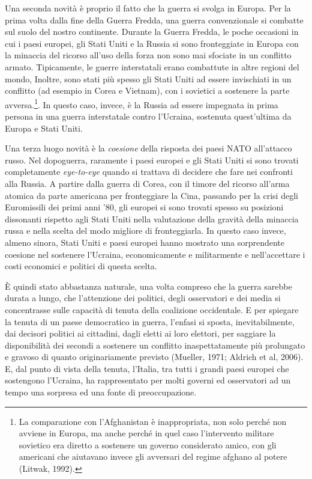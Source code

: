 \documentclass[
]{book}
\begin{document}
Una seconda novità è proprio il fatto che la guerra si svolga in Europa. Per la prima volta dalla fine della Guerra Fredda, una guerra convenzionale si combatte sul suolo del nostro continente. Durante la Guerra Fredda, le poche occasioni in cui i paesi europei, gli Stati Uniti e la Russia si sono fronteggiate in Europa con la minaccia del ricorso all'uso della forza non sono mai sfociate in un conflitto armato. Tipicamente, le guerre interstatali erano combattute in altre regioni del mondo, Inoltre, sono stati più spesso gli Stati Uniti ad essere invischiati in un conflitto (ad esempio in Corea e Vietnam), con i sovietici a sostenere la parte avversa.\footnote{La comparazione con l'Afghanistan è inappropriata, non solo perché non avviene in Europa, ma anche perché in quel caso l'intervento militare sovietico era diretto a sostenere un governo considerato amico, con gli americani che aiutavano invece gli avversari del regime afghano al potere (Litwak, 1992).}. In questo caso, invece, è la Russia ad essere impegnata in prima persona in una guerra interstatale contro l'Ucraina, sostenuta quest'ultima da Europa e Stati Uniti.

Una terza luogo novità è la \emph{coesione} della risposta dei paesi NATO all'attacco russo. Nel dopoguerra, raramente i paesi europei e gli Stati Uniti si sono trovati completamente \emph{eye-to-eye} quando si trattava di decidere che fare nei confronti alla Russia. A partire dalla guerra di Corea, con il timore del ricorso all'arma atomica da parte americana per fronteggiare la Cina, passando per la crisi degli Euromissili dei primi anni '80, gli europei si sono trovati spesso su posizioni dissonanti rispetto agli Stati Uniti nella valutazione della gravità della minaccia russa e nella scelta del modo migliore di fronteggiarla. In questo caso invece, almeno sinora, Stati Uniti e paesi europei hanno mostrato una sorprendente coesione nel sostenere l'Ucraina, economicamente e militarmente e nell'accettare i costi economici e politici di questa scelta.

È quindi stato abbastanza naturale, una volta compreso che la guerra sarebbe durata a lungo, che l'attenzione dei politici, degli osservatori e dei media si concentrasse sulle capacità di tenuta della coalizione occidentale. E per spiegare la tenuta di un paese democratico in guerra, l'enfasi si sposta, inevitabilmente, dai decisori politici ai cittadini, dagli eletti ai loro elettori, per saggiare la disponibilità dei secondi a sostenere un conflitto inaspettatamente più prolungato e gravoso di quanto originariamente previsto (Mueller, 1971; Aldrich et al, 2006). E, dal punto di vista della tenuta, l'Italia, tra tutti i grandi paesi europei che sostengono l'Ucraina, ha rappresentato per molti governi ed osservatori ad un tempo una sorpresa ed una fonte di preoccupazione.
\end{document}
